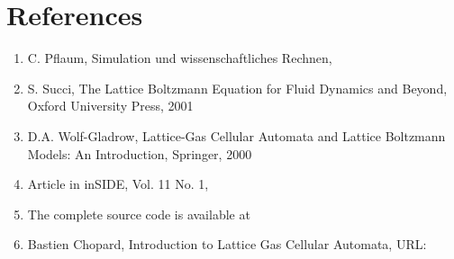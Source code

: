 
\section{References}
\begin{enumerate}
\item
C. Pflaum, Simulation und wissenschaftliches Rechnen,\\
\sloppy
{}
\item
S. Succi, The Lattice Boltzmann Equation for Fluid Dynamics and Beyond, Oxford University Press, 2001
\item
D.A. Wolf-Gladrow, Lattice-Gas Cellular Automata and Lattice Boltzmann Models: An Introduction, Springer, 2000
\item
Article in inSIDE, Vol. 11 No. 1,\\
\sloppy
{}
\item
The complete source code is available at
\sloppy
{}
\item
Bastien Chopard, Introduction to Lattice Gas Cellular Automata, URL:
\sloppy
{}
\end{enumerate}


